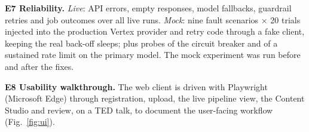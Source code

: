 \textbf{E7 Reliability.} \emph{Live}: API errors, empty responses, model fallbacks, guardrail
retries and job outcomes over all live runs. \emph{Mock}: nine fault scenarios $\times$ 20
trials injected into the production Vertex provider and retry code through a fake client,
keeping the real back-off sleeps; plus probes of the circuit breaker and of a sustained rate
limit on the primary model. The mock experiment was run before and after the fixes.

\textbf{E8 Usability walkthrough.} The web client is driven with Playwright (Microsoft Edge)
through registration, upload, the live pipeline view, the Content Studio and review, on a
TED talk, to document the user-facing workflow (Fig.~\ref{fig:ui}).
